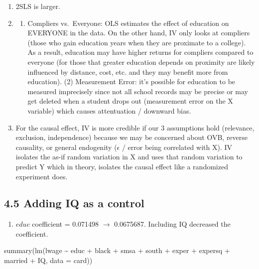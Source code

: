 \documentclass[
  letterpaper,
  DIV=11,
  numbers=noendperiod]{scrartcl}
\newenvironment{Shaded}{\begin{snugshade}}{\end{snugshade}}
\newcommand{\AttributeTok}[1]{\textcolor[rgb]{0.40,0.45,0.13}{#1}}
\newcommand{\FunctionTok}[1]{\textcolor[rgb]{0.28,0.35,0.67}{#1}}
\newcommand{\NormalTok}[1]{\textcolor[rgb]{0.00,0.23,0.31}{#1}}
\newcommand{\SpecialCharTok}[1]{\textcolor[rgb]{0.37,0.37,0.37}{#1}}
\providecommand{\tightlist}{%
  \setlength{\itemsep}{0pt}\setlength{\parskip}{0pt}}\usepackage{longtable,booktabs,array}
\begin{document}
\begin{enumerate}
\def\labelenumi{\alph{enumi}.}
\tightlist
\item
  2SLS is larger.
\item
  \begin{enumerate}
  \def\labelenumii{(\arabic{enumii})}
  \tightlist
  \item
    Compliers vs.~Everyone: OLS estimates the effect of education on
    EVERYONE in the data. On the other hand, IV only looks at compliers
    (those who gain education years when they are proximate to a
    college). As a result, education may have higher returns for
    compliers compared to everyone (for those that greater education
    depends on proximity are likely influenced by distance, cost, etc.
    and they may benefit more from education). (2) Measurement Error:
    it's possible for education to be measured imprecisely since not all
    school records may be precise or may get deleted when a student
    drops out (measurement error on the X variable) which causes
    attentuation / downward bias.
  \end{enumerate}
\item
  For the causal effect, IV is more credible if our 3 assumptions hold
  (relevance, exclusion, independence) because we may be concerned about
  OVB, reverse causality, or general endogenity (\(\epsilon\) / error
  being correlated with X). IV isolates the as-if random variation in X
  and uses that random variation to predict Y which in theory, isolates
  the causal effect like a randomized experiment does.
\end{enumerate}

\subsection{4.5 Adding IQ as a control}\label{adding-iq-as-a-control}

\begin{enumerate}
\def\labelenumi{\alph{enumi}.}
\tightlist
\item
  \(educ\) coefficient = 0.071498 \(\rightarrow\) 0.0675687. Including
  IQ decreased the coefficient.
\end{enumerate}

\begin{Shaded}
\begin{Highlighting}[]
\FunctionTok{summary}\NormalTok{(}\FunctionTok{lm}\NormalTok{(lwage }\SpecialCharTok{\textasciitilde{}}\NormalTok{ educ }\SpecialCharTok{+}\NormalTok{ black }\SpecialCharTok{+}\NormalTok{ smsa }\SpecialCharTok{+}\NormalTok{ south }\SpecialCharTok{+}\NormalTok{ exper }\SpecialCharTok{+}\NormalTok{ expersq }
                         \SpecialCharTok{+}\NormalTok{ married }\SpecialCharTok{+}\NormalTok{ IQ, }\AttributeTok{data =}\NormalTok{ card))}
\end{Highlighting}
\end{Shaded}
\end{document}
